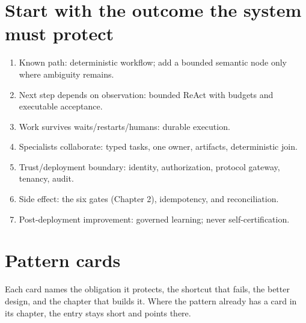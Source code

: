 
\clearpage

\appendix


\section{Start with the outcome the system must protect}

\begin{enumerate}

\item Known path: deterministic workflow; add a bounded semantic node only where ambiguity remains.

\item Next step depends on observation: bounded ReAct with budgets and executable acceptance.

\item Work survives waits/restarts/humans: durable execution.

\item Specialists collaborate: typed tasks, one owner, artifacts, deterministic join.

\item Trust/deployment boundary: identity, authorization, protocol gateway, tenancy, audit.

\item Side effect: the six gates (Chapter 2), idempotency, and reconciliation.

\item Post-deployment improvement: governed learning; never self-certification.

\end{enumerate}


\section{Pattern cards}

Each card names the obligation it protects, the shortcut that fails, the better design, and the chapter that builds it. Where the pattern already has a card in its chapter, the entry stays short and points there.\par

